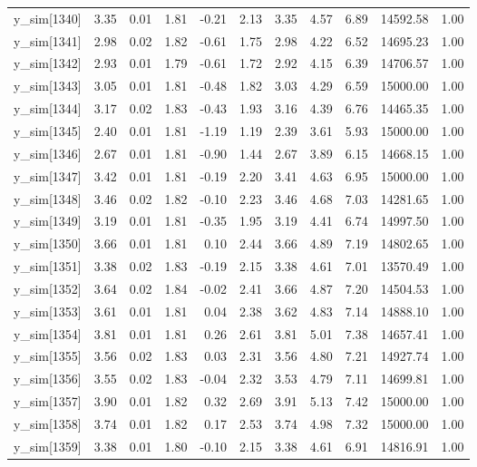 \begin{table}[ht]
\begin{tabular}{rrrrrrrrrrr}
  y\_sim[1340] & 3.35 & 0.01 & 1.81 & -0.21 & 2.13 & 3.35 & 4.57 & 6.89 & 14592.58 & 1.00 \\ 
  y\_sim[1341] & 2.98 & 0.02 & 1.82 & -0.61 & 1.75 & 2.98 & 4.22 & 6.52 & 14695.23 & 1.00 \\ 
  y\_sim[1342] & 2.93 & 0.01 & 1.79 & -0.61 & 1.72 & 2.92 & 4.15 & 6.39 & 14706.57 & 1.00 \\ 
  y\_sim[1343] & 3.05 & 0.01 & 1.81 & -0.48 & 1.82 & 3.03 & 4.29 & 6.59 & 15000.00 & 1.00 \\ 
  y\_sim[1344] & 3.17 & 0.02 & 1.83 & -0.43 & 1.93 & 3.16 & 4.39 & 6.76 & 14465.35 & 1.00 \\ 
  y\_sim[1345] & 2.40 & 0.01 & 1.81 & -1.19 & 1.19 & 2.39 & 3.61 & 5.93 & 15000.00 & 1.00 \\ 
  y\_sim[1346] & 2.67 & 0.01 & 1.81 & -0.90 & 1.44 & 2.67 & 3.89 & 6.15 & 14668.15 & 1.00 \\ 
  y\_sim[1347] & 3.42 & 0.01 & 1.81 & -0.19 & 2.20 & 3.41 & 4.63 & 6.95 & 15000.00 & 1.00 \\ 
  y\_sim[1348] & 3.46 & 0.02 & 1.82 & -0.10 & 2.23 & 3.46 & 4.68 & 7.03 & 14281.65 & 1.00 \\ 
  y\_sim[1349] & 3.19 & 0.01 & 1.81 & -0.35 & 1.95 & 3.19 & 4.41 & 6.74 & 14997.50 & 1.00 \\ 
  y\_sim[1350] & 3.66 & 0.01 & 1.81 & 0.10 & 2.44 & 3.66 & 4.89 & 7.19 & 14802.65 & 1.00 \\ 
  y\_sim[1351] & 3.38 & 0.02 & 1.83 & -0.19 & 2.15 & 3.38 & 4.61 & 7.01 & 13570.49 & 1.00 \\ 
  y\_sim[1352] & 3.64 & 0.02 & 1.84 & -0.02 & 2.41 & 3.66 & 4.87 & 7.20 & 14504.53 & 1.00 \\ 
  y\_sim[1353] & 3.61 & 0.01 & 1.81 & 0.04 & 2.38 & 3.62 & 4.83 & 7.14 & 14888.10 & 1.00 \\ 
  y\_sim[1354] & 3.81 & 0.01 & 1.81 & 0.26 & 2.61 & 3.81 & 5.01 & 7.38 & 14657.41 & 1.00 \\ 
  y\_sim[1355] & 3.56 & 0.02 & 1.83 & 0.03 & 2.31 & 3.56 & 4.80 & 7.21 & 14927.74 & 1.00 \\ 
  y\_sim[1356] & 3.55 & 0.02 & 1.83 & -0.04 & 2.32 & 3.53 & 4.79 & 7.11 & 14699.81 & 1.00 \\ 
  y\_sim[1357] & 3.90 & 0.01 & 1.82 & 0.32 & 2.69 & 3.91 & 5.13 & 7.42 & 15000.00 & 1.00 \\ 
  y\_sim[1358] & 3.74 & 0.01 & 1.82 & 0.17 & 2.53 & 3.74 & 4.98 & 7.32 & 15000.00 & 1.00 \\ 
  y\_sim[1359] & 3.38 & 0.01 & 1.80 & -0.10 & 2.15 & 3.38 & 4.61 & 6.91 & 14816.91 & 1.00 \\ 

\end{tabular}
\end{table}
